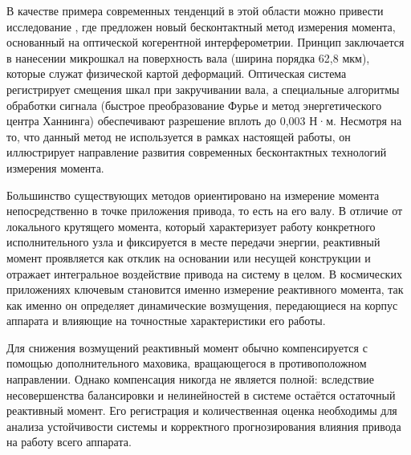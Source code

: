 В качестве примера современных тенденций в этой области можно привести исследование \cite{Chen2024}, где предложен новый бесконтактный метод измерения момента, основанный на оптической когерентной интерферометрии. Принцип заключается в нанесении микрошкал на поверхность вала (ширина порядка 62,8 мкм), которые служат физической картой деформаций. Оптическая система регистрирует смещения шкал при закручивании вала, а специальные алгоритмы обработки сигнала (быстрое преобразование Фурье и метод энергетического центра Ханнинга) обеспечивают разрешение вплоть до 0,003 Н·м. Несмотря на то, что данный метод не используется в рамках настоящей работы, он иллюстрирует направление развития современных бесконтактных технологий измерения момента.

Большинство существующих методов ориентировано на измерение момента непосредственно в точке приложения привода, то есть на его валу. В отличие от локального крутящего момента, который характеризует работу конкретного исполнительного узла и фиксируется в месте передачи энергии, реактивный момент проявляется как отклик на основании или несущей конструкции и отражает интегральное воздействие привода на систему в целом. В космических приложениях ключевым становится именно измерение реактивного момента, так как именно он определяет динамические возмущения, передающиеся на корпус аппарата и влияющие на точностные характеристики его работы.

Для снижения возмущений реактивный момент обычно компенсируется с помощью дополнительного маховика, вращающегося в противоположном направлении. Однако компенсация никогда не является полной: вследствие несовершенства балансировки и нелинейностей в системе остаётся остаточный реактивный момент. Его регистрация и количественная оценка необходимы для анализа устойчивости системы и корректного прогнозирования влияния привода на работу всего аппарата.

